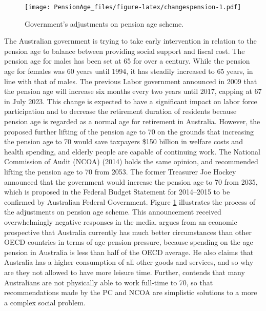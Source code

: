 \documentclass[11pt,a4paper,]{article}
\begin{document}
\begin{figure}
\centering
\texttt{[image: PensionAge\_files/figure-latex/changespension-1.pdf]}
\caption{\label{fig:changespension}Government's adjustments on pension age scheme.}
\end{figure}

The Australian government is trying to take early intervention in relation to the pension age to balance between providing social support and fiscal cost. The pension age for males has been set at 65 for over a century. While the pension age for females was 60 years until 1994, it has steadily increased to 65 years, in line with that of males. The previous Labor government announced in 2009 that the pension age will increase six months every two years until 2017, capping at 67 in July 2023. This change is expected to have a significant impact on labor force participation and to decrease the retirement duration of residents because pension age is regarded as a normal age for retirement in Australia. However, the \textcite{PC13} proposed further lifting of the pension age to 70 on the grounds that increasing the pension age to 70 would save taxpayers \$150 billion in welfare costs and health spending, and elderly people are capable of continuing work. The National Commission of Audit (NCOA) (2014) holds the same opinion, and recommended lifting the pension age to 70 from 2053. The former Treasurer Joe Hockey announced that the government would increase the pension age to 70 from 2035, which is proposed in the Federal Budget Statement for 2014--2015 to be confirmed by Australian Federal Government. Figure \ref{fig:changespension} illustrates the process of the adjustments on pension age scheme. This announcement received overwhelmingly negative responses in the media. \textcite{Guest14} argues from an economic prospective that Australia currently has much better circumstances than other OECD countries in terms of age pension pressure, because spending on the age pension in Australia is less than half of the OECD average. He also claims that Australia has a higher consumption of all other goods and services, and so why are they not allowed to have more leisure time. Further, \textcite{Power14} contends that many Australians are not physically able to work full-time to 70, so that recommendations made by the PC and NCOA are simplistic solutions to a more a complex social problem.
\end{document}
